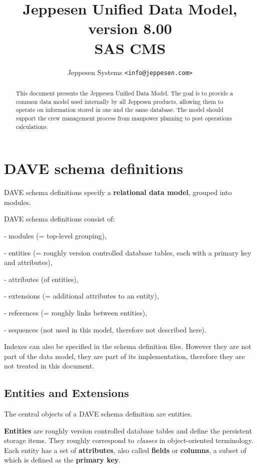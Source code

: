 \documentclass[techdoc]{nobs}   %
\title{Jeppesen Unified Data Model, version 8.00\\ SAS CMS}
\author{Jeppesen Systems \texttt{<info@jeppesen.com>}}
\begin{document}
\maketitle

\begin{abstract}

This document presents the Jeppesen Unified Data Model.
The goal is to provide a common data model used internally by all Jeppesen
products, allowing them to operate on information stored in one and the
same database. The model should support the crew management process from
manpower planning to post operations calculations.

\end{abstract}

\tableofcontents

\newpage


\section{DAVE schema definitions}
\label{sec:DAVE schema definitions}

DAVE schema definitions specify
a {\bf relational data model}, grouped into modules.

DAVE schema definitions consist of:

- modules (= top-level grouping),

- entities (= roughly version controlled database tables, each with a primary key
  and attributes),

- attributes (of entities),

- extensions (= additional attributes to an entity),

- references (= roughly links between entities),

- sequences (not used in this model, therefore not described here).

Indexes can also be specified in the schema definition files.
However they are not part of the data model, they are part of its implementation,
therefore they are not treated in this document.


\subsection{Entities and Extensions}
\label{sec:entities}

The central objects of a DAVE schema definition are entities.

{\bf Entities} are roughly version controlled database tables and define the
persistent storage items.
They roughly correspond to {\em classes} in object-oriented terminology.
Each entity has a set of {\bf attributes},
also called {\bf fields} or {\bf columns},
a subset of which is defined as the {\bf primary key}.
\end{document}
